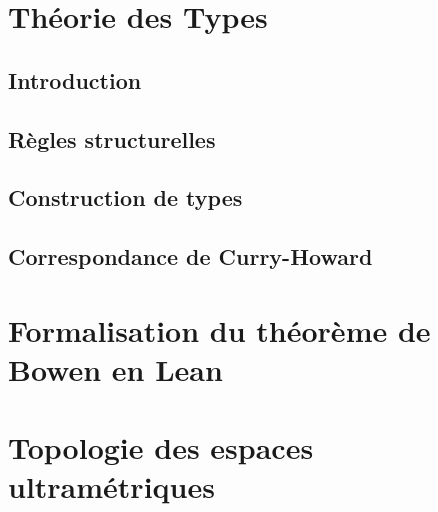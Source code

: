 \documentclass[a4paper, 11pt, twoside]{article}
\title{\Title}
\author{\Author}
\date{\today}
\begin{document}
  \maketitle
  \newpage
  \tableofcontents
  \newpage

  \section{Théorie des Types}
    \subsection{Introduction}
      

    \subsection{Règles structurelles}
      

    \subsection{Construction de types}
      

    \subsection{Correspondance de Curry-Howard}
      

  \newpage
  \section{Formalisation du théorème de Bowen en Lean}
    

  \newpage
  \section{Topologie des espaces ultramétriques}
    

  \newpage
  \nocite{*}
  \thispagestyle{plain}
  \printbibliography[heading=bibintoc, title={Bibliographie}]

\end{document}
